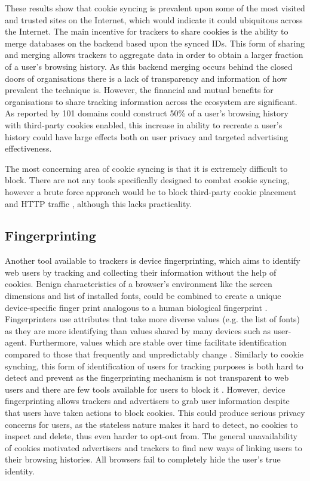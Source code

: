 \documentclass{article}
\begin{document}
These results show that cookie syncing is prevalent upon some of the most visited and trusted sites on the Internet, which would indicate it could ubiquitous across the Internet. The main incentive for trackers to share cookies is the ability to merge databases on the backend based upon the synced IDs. This form of sharing and merging allows trackers to aggregate data in order to obtain a larger fraction of a user's browsing history. As this backend merging occurs behind the closed doors of organisations there is a lack of transparency and information of how prevalent the technique is.  However, the financial and mutual benefits for organisations to share tracking information across the ecosystem are significant. As reported by \parencite{webNeverForgets}  101 domains could construct 50\% of a user's browsing history with third-party cookies enabled, this increase in ability to recreate a user's history could have large effects both on user privacy and targeted advertising effectiveness. \newline

The most concerning area of cookie syncing is that it is extremely difficult to block. There are not any tools specifically designed to combat cookie syncing, however a brute force approach would be to block third-party cookie placement and HTTP traffic \parencite{webNeverForgets}, although this lacks practicality. 

\subsection{Fingerprinting}
Another tool available to trackers is device fingerprinting, which aims to identify web users by tracking and collecting their information without the help of cookies. Benign characteristics of a browser's environment like the screen dimensions and list of installed fonts, could be combined to create a unique device-specific finger print analogous to a human biological fingerprint \parencite{uniqueBrowser}. Fingerprinters use attributes that take more diverse values (e.g. the list of fonts) as they are more identifying than values shared by many devices such as user-agent. Furthermore, values which are stable over time facilitate identification compared to those that frequently and unpredictably change \parencite{dustingFP}. Similarly to cookie synching, this form of identification of users for tracking purposes is both hard to detect and prevent as the fingerprinting mechanism is not transparent to web users and there are few tools available for users to block it \parencite{uniqueBrowser}. However, device fingerprinting allows trackers and advertisers to grab user information despite that users have taken actions to block cookies. This could produce serious privacy concerns for users, as the stateless nature makes it hard to detect, no cookies to inspect and delete, thus even harder to opt-out from. The general unavailability of cookies motivated advertisers and trackers to find new ways of linking users to their browsing histories. All browsers fail to completely hide the user's true identity. \newline 
\end{document}
